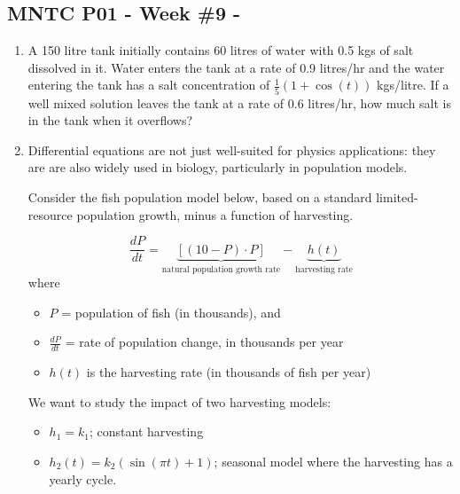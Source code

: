 


\usepackage{bbding} %


\newcommand{\ub}{\underbrace}

\begin{center}
\subsection*{MNTC P01 - Week \#9 - \WeekTitleNine}
\end{center}

\begin{enumerate}
\item A 150 litre tank initially contains 60 litres of water with 0.5
  kgs of salt dissolved in it.  Water enters the tank at a rate of 0.9
  litres/hr and the water entering the tank has a salt concentration
  of $\frac{1}{5}(1 + \cos (t))$ kgs/litre. If a well mixed solution
  leaves the tank at a rate of 0.6 litres/hr, how much salt is in the
  tank when it overflows?


\item Differential equations are not just well-suited for physics
  applications: they are are also widely used in biology, particularly
  in population models.

  Consider the fish population model below, based on a standard
  limited-resource population growth, minus a function of harvesting.

$$\frac{dP}{dt} =\underbrace{ [(10 -P)\cdot P]}_{\mbox{natural population growth rate}} -\underbrace{h(t)}_{\mbox{harvesting rate}}$$
where 
\begin{itemize}
\item $P$  = population of fish (in thousands), and 
\item $\frac{dP}{dt}$  = rate of population change, in thousands per 
year
\item $h(t)$ is the harvesting rate (in thousands of fish per 
year)
\end{itemize}

We want to study the impact of two harvesting models:
\begin{itemize}
\item $h_1 = k_1$; constant harvesting
\item $h_2(t) = k_2 (\sin(\pi t) + 1)$; seasonal model where the
  harvesting has a yearly cycle.
\end{itemize}
\begin{enumerate}


\end{enumerate}
\end{enumerate}
